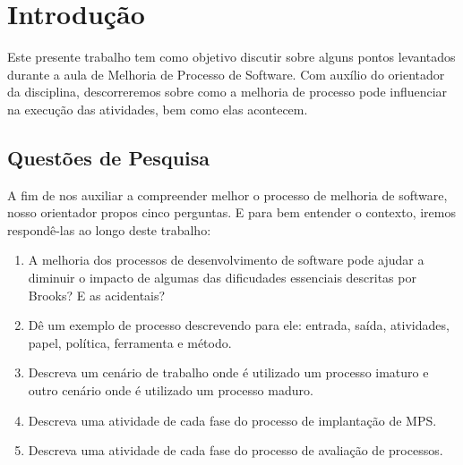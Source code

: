 \chapter[Introdução]{Introdução}

Este presente trabalho tem como objetivo discutir sobre alguns pontos levantados
durante a aula de Melhoria de Processo de Software. Com auxílio do orientador
da disciplina, descorreremos sobre como a melhoria de processo pode influenciar
na execução das atividades, bem como elas acontecem.

\section{Questões de Pesquisa}
\label{sec:Questões de Pesquisa}

A fim de nos auxiliar a compreender melhor o processo de melhoria de software,
nosso orientador propos cinco perguntas. E para bem entender o contexto, iremos
respondê-las ao longo deste trabalho:

\begin{enumerate}
    \item A melhoria dos processos de desenvolvimento de software pode ajudar a diminuir o impacto de algumas das dificudades essenciais descritas por Brooks? E as acidentais?

    \item Dê um exemplo de processo descrevendo para ele: entrada, saída, atividades, papel, política, ferramenta e método.

    \item Descreva um cenário de trabalho onde é utilizado um processo imaturo e outro cenário onde é utilizado um processo maduro.

    \item  Descreva uma atividade de cada fase do processo de implantação de MPS.

    \item Descreva uma atividade de cada fase do processo de avaliação de processos.
\end{enumerate}
